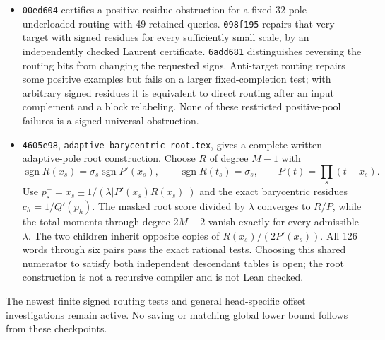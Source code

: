 \documentclass[11pt]{article}
\begin{document}
\begin{itemize}
admissibility forces the invariant cross-ratio
\[
 \frac{(P_1-P_0)(T_1-T_0)}{(T_0-P_0)(T_1-P_1)}<\frac1L.
\]
The geometric two-scale examples violate this for $L\geq2$.
The statement allows projective charts reversing both list orders,
but concerns this exact separable kernel bridge only.
\item \texttt{00ed604} certifies a positive-residue obstruction for
a fixed 32-pole underloaded routing with 49 retained queries.
\texttt{098f195} repairs that very target with signed residues for
every sufficiently small scale, by an independently checked Laurent
certificate. \texttt{6add681} distinguishes reversing the routing
bits from changing the requested signs. Anti-target routing repairs
some positive examples but fails on a larger fixed-completion test;
with arbitrary signed residues it is equivalent to direct routing
after an input complement and a block relabeling. None of these
restricted positive-pool failures is a signed universal obstruction.
\item \texttt{4605e98}, \texttt{adaptive-barycentric-root.tex},
gives a complete written adaptive-pole root construction. Choose
$R$ of degree $M-1$ with
\[
 \operatorname{sgn}R(x_s)=\sigma_s\operatorname{sgn}P'(x_s),
 \qquad \operatorname{sgn}R(t_s)=\sigma_s,
 \qquad P(t)=\prod_s(t-x_s).
\]
Use $p_s^\pm=x_s\pm1/(\lambda|P'(x_s)R(x_s)|)$ and the exact
barycentric residues $c_h=1/Q'(p_h)$. The masked root score divided
by $\lambda$ converges to $R/P$, while the total moments through
degree $2M-2$ vanish exactly for every admissible $\lambda$.
The two children inherit opposite copies of
$R(x_s)/(2P'(x_s))$. All 126 words through six pairs pass the exact
rational tests. Choosing this shared numerator to satisfy both
independent descendant tables is open; the root construction is not
a recursive compiler and is not Lean checked.
\end{itemize}
The newest finite signed routing tests and general head-specific
offset investigations remain active. No saving or matching global
lower bound follows from these checkpoints.
\end{document}
